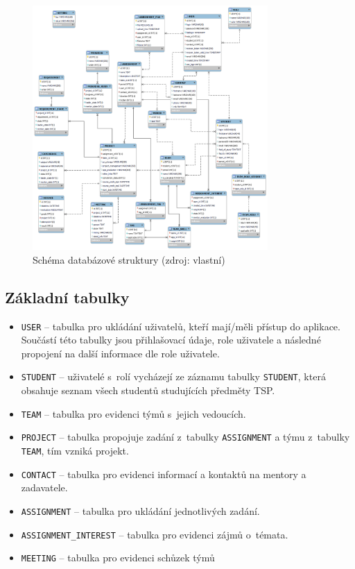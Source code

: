 \documentclass[czech,BP]{thesiskiv}
\begin{document}
		\begin{figure}[H]
			\centering
			\includegraphics[width=0.8\textwidth]{img/database/database_model}
			\caption{Schéma databázové struktury (zdroj: vlastní)}
			\label{fig:strukturaDB}
		\end{figure}
		\subsection{Základní tabulky}
			\begin{itemize}
				\item \texttt{USER} -- tabulka pro ukládání uživatelů, kteří mají/měli přístup do aplikace. Součástí této tabulky jsou přihlašovací údaje, role uživatele a následné propojení na další informace dle role uživatele.
				\item \texttt{STUDENT} -- uživatelé s~rolí  vycházejí ze záznamu tabulky \texttt{STUDENT}, která obsahuje seznam všech studentů studujících předměty TSP.
				\item \texttt{TEAM} -- tabulka pro evidenci týmů s~jejich vedoucích.
				\item \texttt{PROJECT} -- tabulka propojuje zadání z~tabulky \texttt{ASSIGNMENT} a týmu z~tabulky \texttt{TEAM}, tím vzniká projekt.
				\item \texttt{CONTACT} -- tabulka pro evidenci informací a kontaktů na mentory a zadavatele.
				\item \texttt{ASSIGNMENT} -- tabulka pro ukládání jednotlivých zadání.
				\item \texttt{ASSIGNMENT\_INTEREST} -- tabulka pro evidenci zájmů o~témata.
				\item \texttt{MEETING} -- tabulka pro evidenci schůzek týmů
			\end{itemize}
\end{document}

